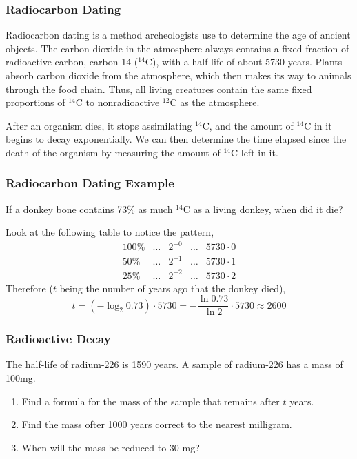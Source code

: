 \documentclass[xcolor=dvipsnames]{beamer}
\begin{document}
\begin{frame}
  \frametitle{Radiocarbon Dating}
Radiocarbon dating is a method archeologists use to determine the age
of ancient objects. The carbon dioxide in the atmosphere always
contains a fixed fraction of radioactive carbon, carbon-14 ($^{14}$C),
with a half-life of about 5730 years. Plants absorb carbon dioxide
from the atmosphere, which then makes its way to animals through the
food chain. Thus, all living creatures contain the same fixed
proportions of $^{14}$C to nonradioactive $^{12}$C as the atmosphere.

\medskip

After an organism dies, it stops assimilating $^{14}$C, and the amount
of $^{14}$C in it begins to decay exponentially. We can then determine
the time elapsed since the death of the organism by measuring the
amount of $^{14}$C left in it.
\end{frame}

\begin{frame}
  \frametitle{Radiocarbon Dating Example}
If a donkey bone contains 73\% as much $^{14}$C as a living donkey,
when did it die?

\medskip

Look at the following table to notice the pattern,
\begin{equation}
  \label{eq:sayeeziu}
  \begin{array}{rcccl}
        100\% & \ldots & 2^{-0} & \ldots & 5730\cdot{}0 \\
        50\% & \ldots & 2^{-1} & \ldots & 5730\cdot{}1 \\
        25\% & \ldots & 2^{-2} & \ldots & 5730\cdot{}2
  \end{array}
\end{equation}
Therefore ($t$ being the number of years ago that the donkey died),
\begin{equation}
  \label{eq:anuvuama}
  t=\left(-\log_{2}0.73\right)\cdot{}5730=-\frac{\ln{}0.73}{\ln{}2}\cdot{}5730\approx{}2600
\end{equation}
\end{frame}

\begin{frame}
  \frametitle{Radioactive Decay}
The half-life of radium-226 is 1590 years. A sample of radium-226 has
a mass of 100mg. 
\begin{enumerate}
\item<1-> Find a formula for the mass of the sample that
remains after $t$ years.
\item<2-> Find the mass ofter 1000 years correct to the nearest
  milligram.
\item<3-> When will the mass be reduced to 30 mg?
\end{enumerate}
\end{frame}
\end{document}
